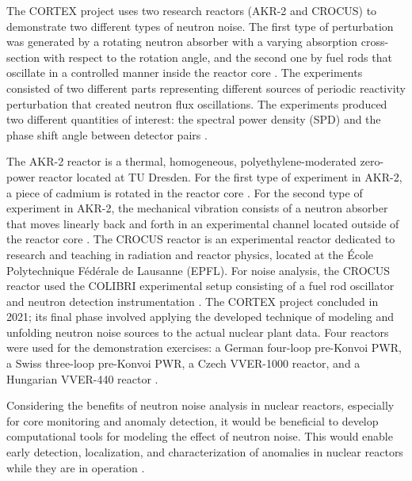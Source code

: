 The CORTEX project uses two research reactors (AKR-2 and CROCUS) to demonstrate two different types of neutron noise. The first type of perturbation was generated by a rotating neutron absorber with a varying absorption cross-section with respect to the rotation angle, and the second one by fuel rods that oscillate in a controlled manner inside the reactor core \cite{lamirandExperimentalReport1st2018, lamirandExperimentalReport2nd2021, lamirandExperimentalReport3rd2021}. The experiments consisted of two different parts representing different sources of periodic reactivity perturbation that created neutron flux oscillations. The experiments produced two different quantities of interest: the spectral power density (SPD) and the phase shift angle between detector pairs \cite{ambrozicNoiseAnalysisTechniques2020}. 

The AKR-2 reactor is a thermal, homogeneous, polyethylene-moderated zero-power reactor located at TU Dresden. For the first type of experiment in AKR-2, a piece of cadmium is rotated in the reactor core \cite{hubnerExperimentalDeterminationZero2021}. For the second type of experiment in AKR-2, the mechanical vibration consists of a neutron absorber that moves linearly back and forth in an experimental channel located outside of the reactor core \cite{lamirandExperimentalReport1st2018}. The CROCUS reactor is an experimental reactor dedicated to research and teaching in radiation and reactor physics, located at the École Polytechnique Fédérale de Lausanne (EPFL). For noise analysis, the CROCUS reactor used the COLIBRI experimental setup consisting of a fuel rod oscillator and neutron detection instrumentation \cite{lamirandExperimentalReport1st2018, lamirandExperimentalReport2nd2021, lamirandExperimentalReport3rd2021, lamirandCOLIBRIExperimentalProgram2020}. The CORTEX project concluded in 2021; its final phase involved applying the developed technique of modeling and unfolding neutron noise sources to the actual nuclear plant data. Four reactors were used for the demonstration exercises: a German four-loop pre-Konvoi PWR, a Swiss three-loop pre-Konvoi PWR, a Czech VVER-1000 reactor, and a Hungarian VVER-440 reactor \cite{demaziereCORTEXProjectImproving2020, seidlReviewHistoricNeutron2015}.

Considering the benefits of neutron noise analysis in nuclear reactors, especially for core monitoring and anomaly detection, it would be beneficial to develop computational tools for modeling the effect of neutron noise. This would enable early detection, localization, and characterization of anomalies in nuclear reactors while they are in operation \cite{demaziereCORTEXProjectImproving2020}.

